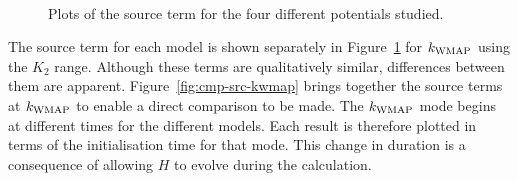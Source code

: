 \begin{figure}[htbp]
\centering%
\qquad%
\\%
\qquad%
\caption[The source term for different potentials]{Plots of the source term for the
four different potentials studied.}
\label{fig:sourcecomparison-res}
\end{figure}
% 
The source term for each model is shown separately in Figure~\ref{fig:sourcecomparison-res} for
$k_\mathrm{WMAP}$ using the $K_2$ range\footnotemark. 
% 
% 
Although these terms are qualitatively similar,
differences between them are apparent. Figure~\ref{fig:cmp-src-kwmap} brings
together the source terms at $k_\mathrm{WMAP}$ to enable a direct comparison to be made. The
$k_\mathrm{WMAP}$ mode begins at different times for the
different models. Each result is therefore plotted in terms of the
initialisation time for that mode.  This change in duration is a consequence of
allowing $H$ to evolve during the calculation. 

